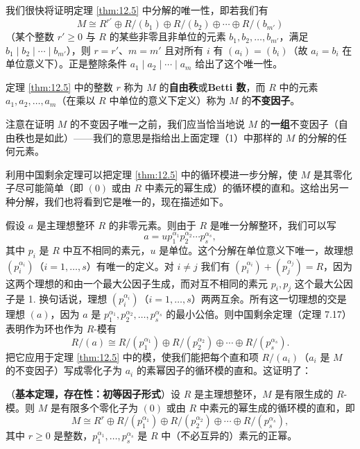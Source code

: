 我们很快将证明定理 \ref{thm:12.5} 中分解的唯一性，即若我们有
\[
M \cong R^{r'} \oplus R/(b_1) \oplus R/(b_2) \oplus \cdots \oplus R/(b_{m'})
\]
（某个整数 \(r' \geq 0\) 与 \(R\) 的某些非零且非单位的元素 \(b_1, b_2, \ldots, b_{m'}\)，满足 \(b_1 \mid b_2 \mid \cdots \mid b_{m'}\)），则 \(r = r'\)、\(m = m'\) 且对所有 \(i\) 有 \((a_i) = (b_i)\)（故 \(a_i = b_i\) 在单位意义下）。正是整除条件 \(a_1 \mid a_2 \mid \cdots \mid a_m\) 给出了这个唯一性。

\begin{definition}
定理 \ref{thm:12.5} 中的整数 \(r\) 称为 \(M\) 的\textbf{自由秩}或\textbf{Betti 数}，而 \(R\) 中的元素 \(a_1, a_2, \ldots, a_m\)（在乘以 \(R\) 中单位的意义下定义）称为 \(M\) 的\textbf{不变因子}。
\end{definition}

注意在证明 \(M\) 的不变因子唯一之前，我们应当恰当地说 \(M\) 的\textbf{一组}不变因子（自由秩也是如此）——我们的意思是指给出上面定理（1）中那样的 \(M\) 的分解的任何元素。

利用中国剩余定理可以把定理 \ref{thm:12.5} 中的循环模进一步分解，使 \(M\) 是其零化子尽可能简单（即 \((0)\) 或由 \(R\) 中素元的幂生成）的循环模的直和。这给出另一种分解，我们也将看到它是唯一的，现在描述如下。

假设 \(a\) 是主理想整环 \(R\) 的非零元素。则由于 \(R\) 是唯一分解整环，我们可以写
\[
a = up_1^{\alpha_1}p_2^{\alpha_2}\cdots p_s^{\alpha_s},
\]
其中 \(p_i\) 是 \(R\) 中互不相同的素元，\(u\) 是单位。这个分解在单位意义下唯一，故理想 \((p_i^{\alpha_i})\)（\(i = 1, \ldots, s\)）有唯一的定义。对 \(i \neq j\) 我们有 \((p_i^{\alpha_i})+(p_j^{\alpha_j}) = R\)，因为这两个理想的和由一个最大公因子生成，而对互不相同的素元 \(p_i, p_j\) 这个最大公因子是 1. 换句话说，理想 \((p_i^{\alpha_i})\)（\(i = 1, \ldots, s\)）两两互余。所有这一切理想的交是理想 \((a)\)，因为 \(a\) 是 \(p_1^{\alpha_1}, p_2^{\alpha_2}, \ldots, p_s^{\alpha_s}\) 的最小公倍。则中国剩余定理（定理 7.17）表明作为环也作为 \(R\)-模有
\[
R/(a) \cong R/(p_1^{\alpha_1}) \oplus R/(p_2^{\alpha_2}) \oplus \cdots \oplus R/(p_s^{\alpha_s}).
\]
把它应用于定理 \ref{thm:12.5} 中的模，使我们能把每个直和项 \(R/(a_i)\)（\(a_i\) 是 \(M\) 的不变因子）写成零化子为 \(a_i\) 的素幂因子的循环模的直和。这证明了：

\begin{theorem}\label{thm:12.6}
（\textbf{基本定理，存在性：初等因子形式}）设 \(R\) 是主理想整环，\(M\) 是有限生成的 \(R\)-模。则 \(M\) 是有限多个零化子为 \((0)\) 或由 \(R\) 中素元的幂生成的循环模的直和，即
\[
M \cong R^r \oplus R/(p_1^{\alpha_1}) \oplus R/(p_2^{\alpha_2}) \oplus \cdots \oplus R/(p_s^{\alpha_s}),
\]
其中 \(r \geq 0\) 是整数，\(p_1^{\alpha_1}, \ldots, p_s^{\alpha_s}\) 是 \(R\) 中（不必互异的）素元的正幂。
\end{theorem}

